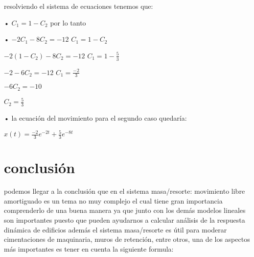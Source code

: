 \documentclass[12pt,a4paper]{article}
\begin{document}
resolviendo el sistema de ecuaciones tenemos que:

\vspace{0.4cm}

• $C_{1} = 1 - C_{2}$   \hspace{5.5cm}   por lo tanto

• $-2C_{1} -8C_{2} = -12$   \hspace{4.5cm} $C_{1} = 1- C_{2}$

$-2(1 - C_{2}) -8C_{2} = -12$   \hspace{3.8cm} $C_{1} = 1- \frac{5}{3}$

$-2 -6C_{2} = -12$   \hspace{5.4 cm}  $C_{1} = \frac{-2}{3}$

$-6C_{2} = -10$

$C_{2} = \frac{5}{3}$


\vspace{0.6cm}

• la ecuación del movimiento para el segundo caso quedaría:

$x(t)=\frac{-2}{3}e^{-2t} + \frac{5}{3}e^{-8t}$

\section*{conclusión}
podemos llegar a la conclusión que en el sistema masa/resorte: movimiento libre amortiguado es un tema no muy complejo el cual tiene gran importancia comprenderlo de una buena manera ya que junto con los demás modelos lineales son importantes puesto que pueden ayudarnos a calcular análisis de la respuesta dinámica de edificios además el  sistema masa/resorte es útil para moderar cimentaciones de maquinaria, muros de retención, entre otros, una de los aspectos más importantes es tener en cuenta la siguiente formula:
\end{document}
